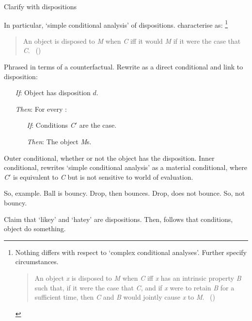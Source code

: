 \begin{note}
  Clarify with dispositions

  In particular, `simple conditional analysis' of dispositions.
  \citeauthor{Choi:2021wg} characterise as:%
  \footnote{
    Nothing differs with respect to `complex conditional analyses'.
    Further specify circumstances.

    \begin{quote}
      An object \emph{x} is disposed to \emph{M} when \emph{C} iff \emph{x} has an intrinsic property \emph{B} such that, if it were the case that \emph{C}, and if \emph{x} were to retain \emph{B} for a sufficient time, then \emph{C} and \emph{B} would jointly cause \emph{x} to \emph{M}.%
      \mbox{ }\hfill\mbox{(\citeauthor[\S1.4]{Choi:2021wg})}
    \end{quote}
  }

  \begin{quote}
    An object is disposed to \emph{M} when \emph{C} iff it would \emph{M} if it were the case that \emph{C}.\newline
    \mbox{ }\hfill\mbox{(\citeyear[\S1.2]{Choi:2021wg})}
  \end{quote}

  Phrased in terms of a counterfactual.
  Rewrite as a direct conditional and link to disposition:

  \begin{itemize}
  \item[\emph{If}:]
    Object has disposition \(d\).
  \item[\emph{Then}:]
    For every :
    \begin{itemize}
    \item[\emph{If}:]
      Conditions \emph{C}\('\) are the case.
    \item[\emph{Then}:]
      The object \emph{M}s.
    \end{itemize}
  \end{itemize}%

  Outer conditional, whether or not the object has the disposition.
  Inner conditional, rewrites `simple conditional analysis' as a material conditional, where \emph{C}\('\) is equivalent to \emph{C} but is not sensitive to world of evaluation.

  So, example.
  Ball is bouncy.
  Drop, then bounces.
  Drop, does not bounce.
  So, not bouncy.

  Claim that `likey' and `hatey' are dispositions.
  Then, follows that conditions, object do something.
\end{note}

